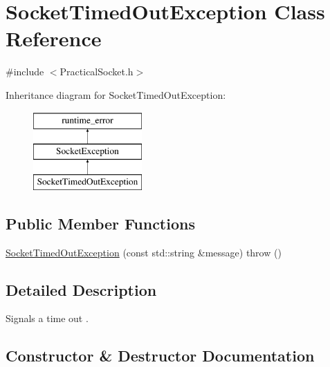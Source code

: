 \hypertarget{class_socket_timed_out_exception}{}\section{Socket\+Timed\+Out\+Exception Class Reference}
\label{class_socket_timed_out_exception}


{\ttfamily \#include $<$Practical\+Socket.\+h$>$}

Inheritance diagram for Socket\+Timed\+Out\+Exception\+:\begin{figure}[H]
\begin{center}
\leavevmode
\includegraphics[height=3.000000cm]{class_socket_timed_out_exception}
\end{center}
\end{figure}
\subsection*{Public Member Functions}
\begin{DoxyCompactItemize}
\item 
\hyperlink{class_socket_timed_out_exception_a6ca791ae28c30df9e6fcfa8359d580b2}{Socket\+Timed\+Out\+Exception} (const std\+::string \&message)  throw ()
\end{DoxyCompactItemize}


\subsection{Detailed Description}
Signals a time out . 

\subsection{Constructor \& Destructor Documentation}

